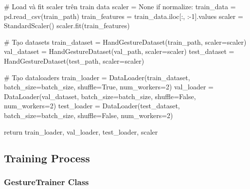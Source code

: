 \begin{aivncodebox}
\begin{python}
    # Load và fit scaler trên train data
    scaler = None
    if normalize:
        train_data = pd.read_csv(train_path)
        train_features = train_data.iloc[:, :-1].values
        scaler = StandardScaler()
        scaler.fit(train_features)
    
    # Tạo datasets
    train_dataset = HandGestureDataset(train_path, scaler=scaler)
    val_dataset = HandGestureDataset(val_path, scaler=scaler)
    test_dataset = HandGestureDataset(test_path, scaler=scaler)
    
    # Tạo dataloaders
    train_loader = DataLoader(train_dataset, batch_size=batch_size, 
                             shuffle=True, num_workers=2)
    val_loader = DataLoader(val_dataset, batch_size=batch_size, 
                           shuffle=False, num_workers=2)
    test_loader = DataLoader(test_dataset, batch_size=batch_size, 
                            shuffle=False, num_workers=2)
    
    return train_loader, val_loader, test_loader, scaler
\end{python}
\end{aivncodebox}

\subsection{Training Process}

\subsubsection{GestureTrainer Class}

